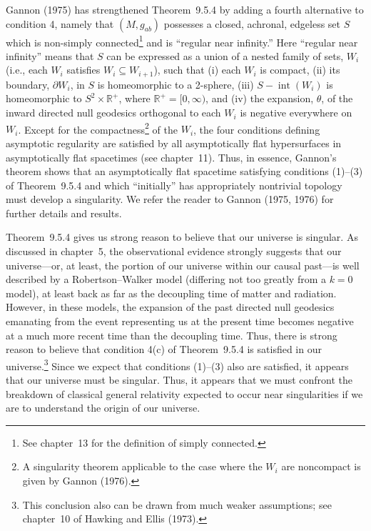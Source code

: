 Gannon (1975) has strengthened Theorem~9.5.4 by adding a fourth alternative to
condition 4, namely that \((M,g_{ab})\) possesses a closed, achronal, edgeless set
\(S\) which is non-simply connected\footnote{See chapter~13 for the definition of
simply connected.} and is ``regular near infinity.'' Here ``regular near infinity''
means that \(S\) can be expressed as a union of a nested family of sets, \(W_i\)
(i.e., each \(W_i\) satisfies \(W_i\subseteq W_{i+1}\)), such that (i) each \(W_i\) is
compact, (ii) its boundary, \(\partial W_i\), in \(S\) is homeomorphic to a 2-sphere,
(iii) \(S-\operatorname{int}(W_i)\) is homeomorphic to
\(S^2\times\mathbb R^+\), where \(\mathbb R^+=[0,\infty)\), and (iv) the expansion,
\(\theta\), of the inward directed null geodesics orthogonal to each \(W_i\) is
negative everywhere on \(W_i\). Except for the compactness\footnote{A singularity
theorem applicable to the case where the \(W_i\) are noncompact is given by Gannon
(1976).} of the \(W_i\), the four conditions defining asymptotic regularity are
satisfied by all asymptotically flat hypersurfaces in asymptotically flat spacetimes
(see chapter~11). Thus, in essence, Gannon's theorem shows that an asymptotically
flat spacetime satisfying conditions (1)--(3) of Theorem~9.5.4 and which
``initially'' has appropriately nontrivial topology must develop a singularity. We
refer the reader to Gannon (1975, 1976) for further details and results.

Theorem~9.5.4 gives us strong reason to believe that our universe is singular. As
discussed in chapter~5, the observational evidence strongly suggests that our
universe---or, at least, the portion of our universe within our causal past---is well
described by a Robertson--Walker model (differing not too greatly from a \(k=0\)
model), at least back as far as the decoupling time of matter and radiation. However,
in these models, the expansion of the past directed null geodesics emanating from the
event representing us at the present time becomes negative at a much more recent time
than the decoupling time. Thus, there is strong reason to believe that condition 4(c)
of Theorem~9.5.4 is satisfied in our universe.\footnote{This conclusion also can be
drawn from much weaker assumptions; see chapter~10 of Hawking and Ellis (1973).}
Since we expect that conditions (1)--(3) also are satisfied, it appears that our
universe must be singular. Thus, it appears that we must confront the breakdown of
classical general relativity expected to occur near singularities if we are to
understand the origin of our universe.
